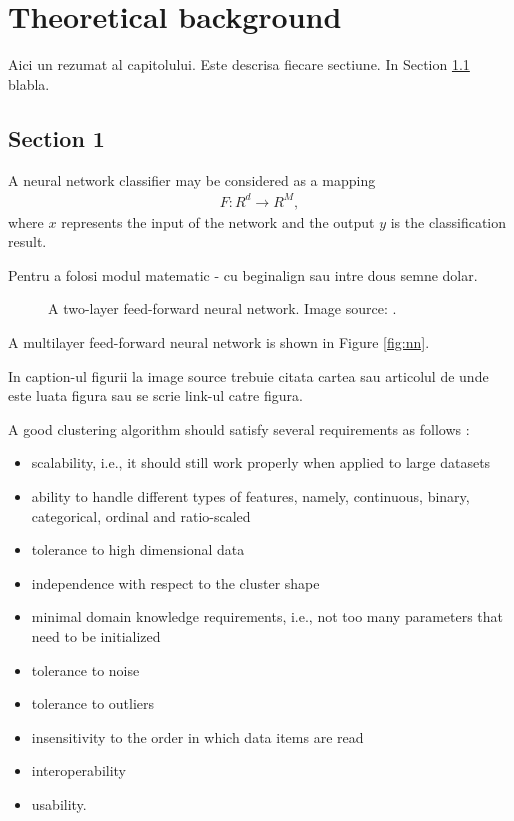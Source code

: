 \chapter{Theoretical background}
\label{chap:background}

Aici un rezumat al capitolului.
Este descrisa fiecare sectiune.
In Section \ref{sec:section1} blabla.

\section{Section 1}
\label{sec:section1}


A neural network classifier may be considered as a mapping
\begin{align}
F: R^{d} \rightarrow R^{M},
\end{align}
where $x$ represents the input of the network and the output $y$ is the classification result.

Pentru a folosi modul matematic - cu beginalign sau intre dous semne dolar.

\begin{figure}[h!]
\label{fig:nn}
\centerline{}
      \caption[Neural network]{A two-layer feed-forward neural network. Image source: \cite{Han06DataMining}.}
\label{fig:decisiontree}
\end{figure}

A multilayer feed-forward neural network is shown in Figure \ref{fig:nn}.

In caption-ul figurii la image source trebuie citata cartea \cite{Han06DataMining} sau articolul de unde este luata figura sau se scrie link-ul catre figura.


A good clustering algorithm should satisfy several requirements as follows \cite{website:clustering}:

\begin{itemize}
\item scalability, i.e., it should still work properly when applied to large datasets
\item ability to handle different types of features, namely, continuous, binary, categorical, ordinal and ratio-scaled
\item tolerance to high dimensional data
\item independence with respect to the cluster shape
\item minimal domain knowledge requirements, i.e., not too many parameters that need to be initialized
\item tolerance to noise
\item tolerance to outliers
\item insensitivity to the order in which data items are read
\item interoperability
\item usability.
\end{itemize}

